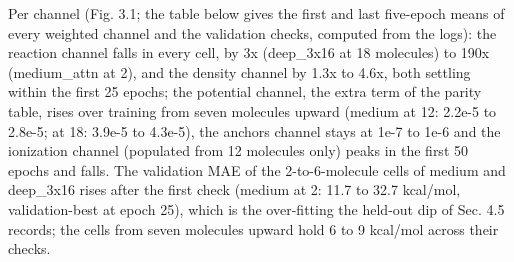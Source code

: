 \documentclass[10pt,a4paper]{article}
\begin{document}
Per channel (Fig. 3.1; the table below gives the first and last five-epoch means of every
weighted channel and the validation checks, computed from the logs): the reaction channel
falls in every cell, by 3x (deep\_3x16 at 18 molecules) to 190x (medium\_attn at 2), and
the density channel by 1.3x to 4.6x, both settling within the first 25 epochs; the potential channel,
the extra term of the parity table, rises over training from seven molecules upward (medium
at 12: 2.2e-5 to 2.8e-5; at 18: 3.9e-5 to 4.3e-5), the anchors channel stays at 1e-7 to
1e-6 and the ionization channel (populated from 12 molecules only) peaks in the first 50
epochs and falls. The validation MAE of the 2-to-6-molecule cells of medium and deep\_3x16
rises after the first check (medium at 2: 11.7 to 32.7 kcal/mol, validation-best at epoch
25), which is the over-fitting the held-out dip of Sec. 4.5 records; the cells from seven
molecules upward hold 6 to 9 kcal/mol across their checks.
\end{document}
